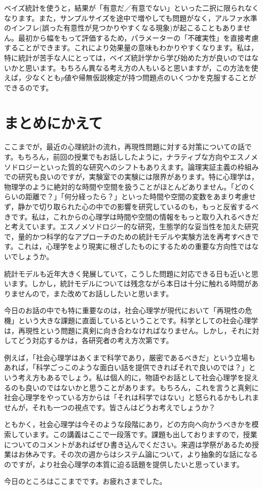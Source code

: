\documentclass{ltjsbook}
\begin{document}
ベイズ統計を使うと，結果が「有意だ／有意でない」といった二択に限られなくなります。また，サンプルサイズを途中で増やしても問題がなく，アルファ水準のインフレ(誤った有意性が見つかりやすくなる現象)が起こることもありません。最初から幅をもって評価するため，パラメーターの「不確実性」を直接考慮することができます。これにより効果量の意味もわかりやすくなります。私は，特に統計が苦手な人にとっては，ベイズ統計学から学び始めた方が良いのではないかと思います。もちろん異なる考え方の人もいると思いますが，この方法を使えば，少なくとも$p$値や帰無仮説検定が持つ問題点のいくつかを克服することができるのです。

\section{まとめにかえて}

ここまでが，最近の心理統計の流れ，再現性問題に対する対策についての話です。もちろん，前回の授業でもお話ししたように，ナラティブな方向やエスノメソドロジーといった質的な研究へのシフトもありえます。論理実証主義の枠組みでの研究も良いのですが，実験室での実験には限界があります。特に心理学は，物理学のように絶対的な時間や空間を扱うことがほとんどありません。「どのくらいの距離で？」「何分経ったら？」といった時間や空間の変数をあまり考慮せず，静かで切り取られた心の中での影響を研究しているのも，もっと反省するべきです。私は，これからの心理学は時間や空間の情報をもっと取り入れるべきだと考えています。エスノメソドロジー的な研究，生態学的な妥当性を加えた研究で，量的かつ科学的なアプローチのための統計モデルや実験方法を再考すべきです。これは，心理学をより現実に根ざしたものにするための重要な方向性ではないでしょうか。

統計モデルも近年大きく発展していて，こうした問題に対応できる日も近いと思います。しかし，統計モデルについては残念ながら本日は十分に触れる時間がありませんので，また改めてお話ししたいと思います。

今日のお話の中でも特に重要なのは，社会心理学が現代において「再現性の危機」という大きな課題に直面しているということです。科学としての社会心理学は，再現性という問題に真剣に向き合わなければなりません。しかし，それに対してどう対応するかは，各研究者の考え方次第です。

例えば，「社会心理学はあくまで科学であり，厳密であるべきだ」という立場もあれば，「科学ごっこのような面白い話を提供できればそれで良いのでは？」という考え方もあるでしょう。私は個人的に，物語やお話として社会心理学を捉えるのも良いのではないかと思うことがあります。もちろん，これを言うと真剣に社会心理学をやっている方からは「それは科学ではない」と怒られるかもしれませんが，それも一つの視点です。皆さんはどうお考えでしょうか？

ともかく，社会心理学は今そのような段階にあり，どの方向へ向かうべきかを模索しています。この講義はここで一段落です。課題も出しておりますので，授業についてのコメントがあればぜひ書き込んでください。来週は学祭があるため授業はお休みです。その次の週からはシステム論について，より抽象的な話になるのですが，より社会心理学の本質に迫る話題を提供したいと思っています。

今日のところはここまでです。お疲れさまでした。

\printbibliography[title=引用文献]
\end{document}
